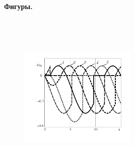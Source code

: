 % 

% 

% 

% 


\newpage

{\bf Фигуры.}

\begin{figure}[H]
    \hspace{-0.6cm}
        \caption{\ }
        \label{fig:wheel}
    \endminipage
        \caption{\ }
        \label{fig:vehicle}
    \endminipage
\end{figure}

\begin{figure}[H]
    \centering
    \quad
    \caption{\ }
    \label{fig:overlap_and_change}
\end{figure}



\begin{figure}[H]
  \includegraphics[width=0.5\textwidth]{pic/figure5_1.pdf}
  \caption{\ }
  \label{fig:selfrot}
\end{figure}

